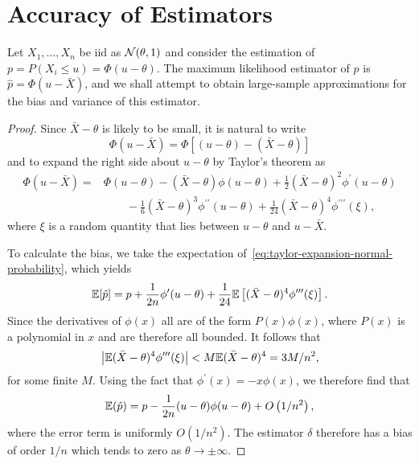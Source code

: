 \section{Accuracy of Estimators}

\begin{example}
	Let \(X_{1},\ldots,X_{n}\) be iid as \(\mathcal{N}(\theta,1)\) and consider the estimation of \(p=P\left(X_{i}\leq u\right)=\Phi(u-\theta)\). The maximum likelihood estimator of \(p\) is \(\hat{p}=\Phi(u-\bar{X})\), and we shall attempt to obtain large-sample approximations for the bias and variance of this estimator.
\end{example}

\begin{proof}
	Since \(\bar{X}-\theta\) is likely to be small, it is natural to write
	\begin{equation*}
		\Phi(u-\bar{X})=\Phi[(u-\theta)-(\bar{X}-\theta)]
	\end{equation*}
	and to expand the right side about \(u-\theta\) by Taylor's theorem as
	\begin{equation}
		\label{eq:taylor-expansion-normal-probability}
		\begin{aligned}
			\Phi(u-\bar{X})= & \Phi(u-\theta)-(\bar{X}-\theta)\phi(u-\theta)+\frac{1}{2}(\bar{X}-\theta)^{2}\phi^{\prime}(u-\theta)                                  \\
			                 & \qquad -\frac{1}{6}(\bar{X}-\theta)^{3}\phi^{\prime\prime}(u-\theta)+\frac{1}{24}(\bar{X}-\theta)^{4}\phi^{\prime\prime \prime}(\xi),
		\end{aligned}
	\end{equation}
	where \(\xi\) is a random quantity that lies between \(u-\theta\) and \(u-\bar{X}\).

	To calculate the bias, we take the expectation of~\eqref{eq:taylor-expansion-normal-probability}, which yields
	\begin{equation*}
		\mathbb{E}[\hat{p}]=p+\frac{1}{2n}\phi^{\prime}(u-\theta)+\frac{1}{24}\mathbb{E}\left[(\bar{X}-\theta)^4\phi^{\prime\prime\prime}(\xi)\right].
	\end{equation*}
	Since the derivatives of \(\phi(x)\) all are of the form \(P(x)\phi(x)\), where \(P(x)\) is a polynomial in \(x\) and are therefore all bounded. It follows that
	\begin{equation*}
		\left|\mathbb{E}(\bar{X}-\theta)^{4}\phi^{\prime\prime\prime}(\xi)\right|<M\mathbb{E}(\bar{X}-\theta)^{4}=3M/n^2,
	\end{equation*}
	for some finite \(M\). Using the fact that \(\phi^{\prime}(x)=-x \phi(x)\), we therefore find that
	\begin{equation*}
		\mathbb{E}(\hat{p})=p-\frac{1}{2n}(u-\theta)\phi(u-\theta)+O\left(1/n^{2}\right),
	\end{equation*}
	where the error term is uniformly \(O\left(1 / n^2\right)\).
	The estimator \(\delta\) therefore has a bias of order \(1/n\) which tends to zero as \(\theta \rightarrow \pm \infty\).


\end{proof}
